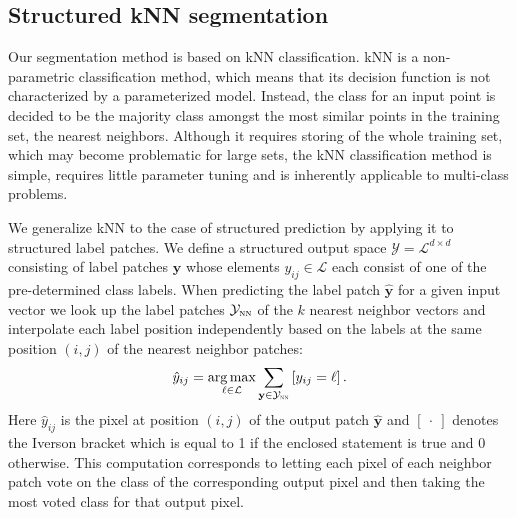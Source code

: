 \documentclass[a4paper,titlepage]{article}
\renewcommand{\vec}[1]{\mathbf{#1}}
\DeclareMathOperator*{\argmax}{arg\,max}
\begin{document}
\subsection{Structured \acl{kNN} segmentation}

Our segmentation method is based on \acf{kNN} classification. \ac{kNN} is a non-parametric classification method, which means that its decision function is not characterized by a parameterized model. Instead, the class for an input point is decided to be the majority class amongst the most similar points in the training set, the nearest neighbors. Although it requires storing of the whole training set, which may become problematic for large sets, the \ac{kNN} classification method is simple, requires little parameter tuning and is inherently applicable to multi-class problems. 

We generalize \ac{kNN} to the case of structured prediction by applying it to structured label patches. %
We define a structured output space $\mathcal{Y} = \mathcal{L}^{d \times d}$ consisting of label patches $\vec{y}$ whose elements $y_{ij} \in \mathcal{L}$ each consist of one of the pre-determined class labels. When predicting the label patch $\hat{\vec{y}}$ for a given input vector we look up the label patches $\mathcal{Y}_\textsc{nn}$ of the $k$ nearest neighbor vectors  and interpolate each label position independently based on the labels at the same position $(i,j)$ of the nearest neighbor patches:
\begin{equation}
\hat{y}_{ij} = \argmax_{\ell \in \mathcal{L}} \sum_{\vec{y} \in \mathcal{Y}_\textsc{nn}} \left[ y_{ij} = \ell \right ].
\label{eq:nn_decision_rule}
\end{equation}
Here $\hat{y}_{ij}$ is the pixel at position $(i,j)$ of the output patch $\hat{\vec{y}}$ and $\left [\ \cdot \ \right ]$ denotes the Iverson bracket which is equal to 1 if the enclosed statement is true and 0 otherwise. This computation corresponds to letting each pixel of each neighbor patch vote on the class of the corresponding output pixel and then taking the most voted class for that output pixel.
\end{document}
